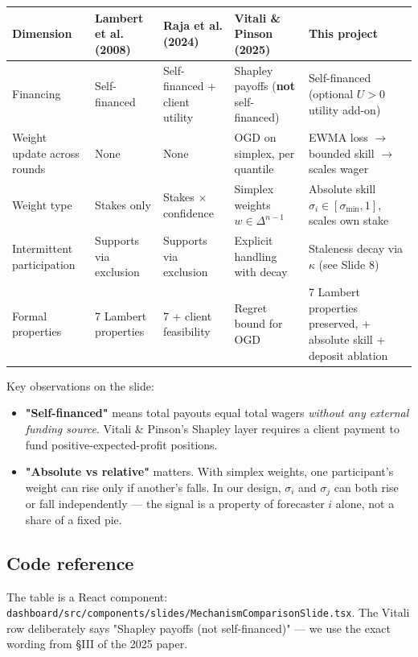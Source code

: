 \documentclass[11pt]{article}
\begin{document}
\begin{center}
\begin{tabular}{lllll}
\toprule
Dimension & Lambert et al. (2008) & Raja et al. (2024) & Vitali \& Pinson (2025) & \textbf{This project} \\
\midrule
Financing & Self-financed & Self-financed + client utility & Shapley payoffs (\textbf{not} self-financed) & Self-financed (optional $U>0$ utility add-on) \\
Weight update across rounds & None & None & OGD on simplex, per quantile & EWMA loss $\rightarrow$ bounded skill $\rightarrow$ scales wager \\
Weight type & Stakes only & Stakes $\times$ confidence & Simplex weights $w \in \Delta^{n-1}$ & Absolute skill $\sigma_i \in [\sigma_{\min}, 1]$, scales own stake \\
Intermittent participation & Supports via exclusion & Supports via exclusion & Explicit handling with decay & Staleness decay via $\kappa$ (see Slide 8) \\
Formal properties & 7 Lambert properties & 7 + client feasibility & Regret bound for OGD & 7 Lambert properties preserved, + absolute skill + deposit ablation \\
\bottomrule
\end{tabular}
\end{center}

Key observations on the slide:

\begin{itemize}
\item \textbf{"Self-financed"} means total payouts equal total wagers \emph{without any external funding source}. Vitali \& Pinson's Shapley layer requires a client payment to fund positive-expected-profit positions.
\item \textbf{"Absolute vs relative"} matters. With simplex weights, one participant's weight can rise only if another's falls. In our design, $\sigma_i$ and $\sigma_j$ can both rise or fall independently --- the signal is a property of forecaster $i$ alone, not a share of a fixed pie.
\end{itemize}

\subsection{Code reference}


The table is a React component: \texttt{dashboard/src/components/slides/MechanismComparisonSlide.tsx}. The Vitali row deliberately says "Shapley payoffs (not self-financed)" --- we use the exact wording from \S III of the 2025 paper.
\end{document}
